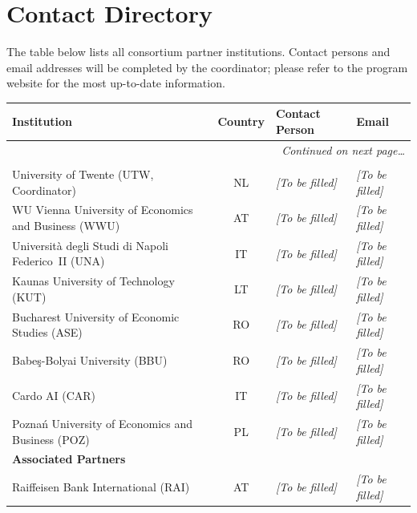\chapter{Contact Directory}
\label{app:contacts}

The table below lists all consortium partner institutions.  Contact persons and
email addresses will be completed by the coordinator; please refer to the
program website for the most up-to-date information.

\vspace{6pt}

\begin{small}
\begin{longtable}{p{5.8cm} c p{3.6cm} p{3.6cm}}
\toprule
\textbf{Institution} & \textbf{Country} & \textbf{Contact Person} & \textbf{Email} \\
\midrule
\endhead
\midrule
\multicolumn{4}{r}{\small\itshape Continued on next page\ldots} \\
\endfoot
\bottomrule
\endlastfoot
%
\multicolumn{4}{l}{\textbf{\sffamily\color{mscaDarkBlue}Beneficiary Partners}} \\[3pt]
University of Twente (UTW, Coordinator)
  & NL & \emph{[To be filled]} & \emph{[To be filled]} \\
WU Vienna University of Economics and Business (WWU)
  & AT & \emph{[To be filled]} & \emph{[To be filled]} \\
Universit\`a degli Studi di Napoli Federico~II (UNA)
  & IT & \emph{[To be filled]} & \emph{[To be filled]} \\
Kaunas University of Technology (KUT)
  & LT & \emph{[To be filled]} & \emph{[To be filled]} \\
Bucharest University of Economic Studies (ASE)
  & RO & \emph{[To be filled]} & \emph{[To be filled]} \\
Babe\c{s}-Bolyai University (BBU)
  & RO & \emph{[To be filled]} & \emph{[To be filled]} \\
Cardo AI (CAR)
  & IT & \emph{[To be filled]} & \emph{[To be filled]} \\
Pozna\'{n} University of Economics and Business (POZ)
  & PL & \emph{[To be filled]} & \emph{[To be filled]} \\[\medskipamount]
%
\multicolumn{4}{l}{\textbf{\sffamily\color{mscaDarkBlue}Associated Partners}} \\[3pt]
Raiffeisen Bank International (RAI)
  & AT & \emph{[To be filled]} & \emph{[To be filled]} \\

\end{longtable}
\end{small}
